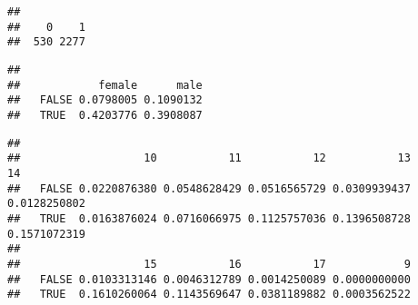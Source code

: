 \documentclass[
]{article}
\newenvironment{Shaded}{\begin{snugshade}}{\end{snugshade}}
\newcommand{\CommentTok}[1]{\textcolor[rgb]{0.56,0.35,0.01}{\textit{#1}}}
\newcommand{\DecValTok}[1]{\textcolor[rgb]{0.00,0.00,0.81}{#1}}
\newcommand{\KeywordTok}[1]{\textcolor[rgb]{0.13,0.29,0.53}{\textbf{#1}}}
\newcommand{\NormalTok}[1]{#1}
\newcommand{\OperatorTok}[1]{\textcolor[rgb]{0.81,0.36,0.00}{\textbf{#1}}}
\newcommand{\StringTok}[1]{\textcolor[rgb]{0.31,0.60,0.02}{#1}}
\begin{document}
\begin{Shaded}
\end{Shaded}

\begin{verbatim}
## 
##    0    1 
##  530 2277
\end{verbatim}

\begin{Shaded}
\end{Shaded}

\begin{verbatim}
##        
##            female      male
##   FALSE 0.0798005 0.1090132
##   TRUE  0.4203776 0.3908087
\end{verbatim}

\begin{Shaded}
\end{Shaded}

\begin{verbatim}
##        
##                   10           11           12           13           14
##   FALSE 0.0220876380 0.0548628429 0.0516565729 0.0309939437 0.0128250802
##   TRUE  0.0163876024 0.0716066975 0.1125757036 0.1396508728 0.1571072319
##        
##                   15           16           17            9
##   FALSE 0.0103313146 0.0046312789 0.0014250089 0.0000000000
##   TRUE  0.1610260064 0.1143569647 0.0381189882 0.0003562522
\end{verbatim}
\end{document}

